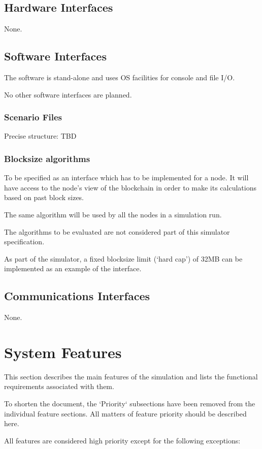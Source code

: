 \documentclass{scrreprt}
\begin{document}
\section{Hardware Interfaces}
None.

\section{Software Interfaces}
The software is stand-alone and uses OS facilities for console and file I/O.

No other software interfaces are planned.

\subsection{Scenario Files}
Precise structure: TBD

\subsection{Blocksize algorithms}

To be specified as an interface which has to be implemented for a node.
It will have access to the node's view of the blockchain in order to make
its calculations based on past block sizes.

The same algorithm will be used by all the nodes in a simulation run.

The algorithms to be evaluated are not considered part of this simulator
specification.

As part of the simulator, a fixed blocksize limit (`hard cap') of 32MB
can be implemented as an example of the interface.


\section{Communications Interfaces}
None.


\chapter{System Features}

This section describes the main features of the simulation and lists the
functional requirements associated with them.

To shorten the document, the `Priority` subsections have been removed
from the individual feature sections. All matters of feature priority should
be described here.

All features are considered high priority except for the following exceptions:
\end{document}
